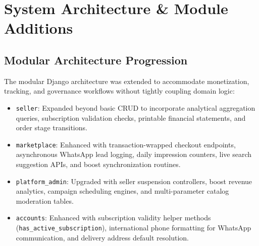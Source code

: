 \documentclass[12pt,a4paper]{article}
\begin{document}
\section{System Architecture \& Module Additions}

\subsection{Modular Architecture Progression}
The modular Django architecture was extended to accommodate monetization, tracking, and governance workflows without tightly coupling domain logic:

\begin{itemize}
    \item \texttt{seller}: Expanded beyond basic CRUD to incorporate analytical aggregation queries, subscription validation checks, printable financial statements, and order stage transitions.
    \item \texttt{marketplace}: Enhanced with transaction-wrapped checkout endpoints, asynchronous WhatsApp lead logging, daily impression counters, live search suggestion APIs, and boost synchronization routines.
    \item \texttt{platform\_admin}: Upgraded with seller suspension controllers, boost revenue analytics, campaign scheduling engines, and multi-parameter catalog moderation tables.
    \item \texttt{accounts}: Enhanced with subscription validity helper methods (\texttt{has\_active\_subscription}), international phone formatting for WhatsApp communication, and delivery address default resolution.
\end{itemize}
\end{document}
